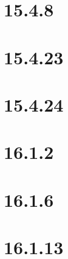 \documentclass{report}
\begin{document}
\section*{15.4.8}
\section*{15.4.23}
\section*{15.4.24}
\section*{16.1.2}
\section*{16.1.6}
\section*{16.1.13}
\end{document}
